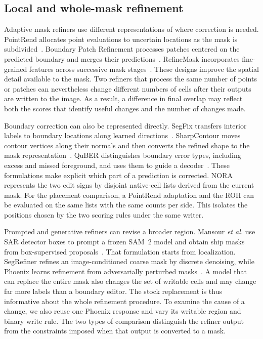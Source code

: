 \documentclass[journal]{IEEEtran}
\begin{document}
\subsection{Local and whole-mask refinement}

Adaptive mask refiners use different representations of where correction is needed. PointRend allocates point evaluations to uncertain locations as the mask is subdivided~\cite{pointrend}. Boundary Patch Refinement processes patches centered on the predicted boundary and merges their predictions~\cite{bpr}. RefineMask incorporates fine-grained features across successive mask stages~\cite{refinemask}. These designs improve the spatial detail available to the mask. Two refiners that process the same number of points or patches can nevertheless change different numbers of cells after their outputs are written to the image. As a result, a difference in final overlap may reflect both the scores that identify useful changes and the number of changes made.

Boundary correction can also be represented directly. SegFix transfers interior labels to boundary locations along learned directions~\cite{segfix}. SharpContour moves contour vertices along their normals and then converts the refined shape to the mask representation~\cite{sharpcontour}. QuBER distinguishes boundary error types, including excess and missed foreground, and uses them to guide a decoder~\cite{quber}. These formulations make explicit which part of a prediction is corrected. NORA represents the two edit signs by disjoint native-cell lists derived from the current mask. For the placement comparison, a PointRend adaptation and the ROH can be evaluated on the same lists with the same counts per side. This isolates the positions chosen by the two scoring rules under the same writer.

Prompted and generative refiners can revise a broader region. Mansour \emph{et al.} use SAR detector boxes to prompt a frozen SAM~2 model and obtain ship masks from box-supervised proposals~\cite{mansour2026}. That formulation starts from localization. SegRefiner refines an image-conditioned coarse mask by discrete denoising, while Phoenix learns refinement from adversarially perturbed masks~\cite{segrefiner,phoenix}. A model that can replace the entire mask also changes the set of writable cells and may change far more labels than a boundary editor. The stock replacement is thus informative about the whole refinement procedure. To examine the cause of a change, we also reuse one Phoenix response and vary its writable region and binary write rule. The two types of comparison distinguish the refiner output from the constraints imposed when that output is converted to a mask.
\end{document}
